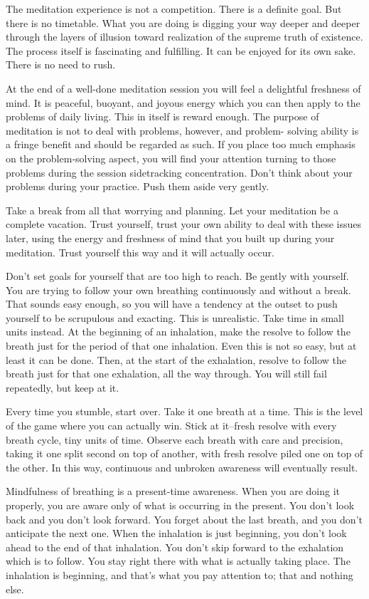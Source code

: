 The meditation experience is not a competition. There is a definite goal. But
there is no timetable. What you are doing is digging your way deeper and deeper
through the layers of illusion toward realization of the supreme truth of
existence. The process itself is fascinating and fulfilling. It can be enjoyed
for its own sake. There is no need to rush.

At the end of a well-done meditation session you will feel a delightful
freshness of mind. It is peaceful, buoyant, and joyous energy which you can then
apply to the problems of daily living. This in itself is reward enough. The
purpose of meditation is not to deal with problems, however, and problem-
solving ability is a fringe benefit and should be regarded as such. If you place
too much emphasis on the problem-solving aspect, you will find your attention
turning to those problems during the session sidetracking concentration. Don't
think about your problems during your practice. Push them aside very gently.

Take a break from all that worrying and planning. Let your meditation be a
complete vacation. Trust yourself, trust your own ability to deal with these
issues later, using the energy and freshness of mind that you built up during
your meditation. Trust yourself this way and it will actually occur.

Don't set goals for yourself that are too high to reach. Be gently with
yourself. You are trying to follow your own breathing continuously and without a
break. That sounds easy enough, so you will have a tendency at the outset to
push yourself to be scrupulous and exacting. This is unrealistic. Take time in
small units instead. At the beginning of an inhalation, make the resolve to
follow the breath just for the period of that one inhalation. Even this is not
so easy, but at least it can be done. Then, at the start of the exhalation,
resolve to follow the breath just for that one exhalation, all the way through.
You will still fail repeatedly, but keep at it.

Every time you stumble, start over. Take it one breath at a time. This is the
level of the game where you can actually win. Stick at it--fresh resolve with
every breath cycle, tiny units of time. Observe each breath with care and
precision, taking it one split second on top of another, with fresh resolve
piled one on top of the other. In this way, continuous and unbroken awareness
will eventually result.

Mindfulness of breathing is a present-time awareness. When you are doing it
properly, you are aware only of what is occurring in the present. You don't look
back and you don't look forward. You forget about the last breath, and you don't
anticipate the next one. When the inhalation is just beginning, you don't look
ahead to the end of that inhalation. You don't skip forward to the exhalation
which is to follow. You stay right there with what is actually taking place. The
inhalation is beginning, and that's what you pay attention to; that and nothing
else.


